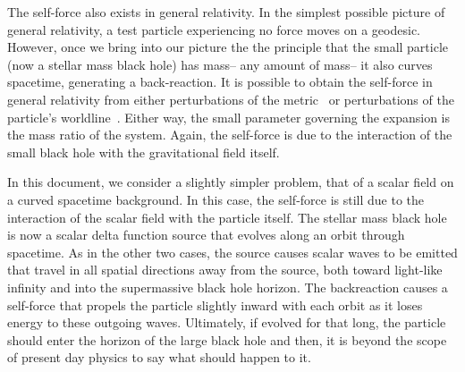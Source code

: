 The self-force also exists in general relativity. In the simplest possible picture of general relativity, a test particle experiencing no force moves on a geodesic. However, once we bring into our picture the the principle that the small particle (now a stellar mass black hole) has mass-- any amount of mass-- it also curves spacetime, generating a back-reaction. It is possible to obtain the self-force in general relativity from either perturbations of the metric~\cite{pound2ndOrderSelfForce2} or perturbations of the particle's worldline~\cite{WardellSelfForceReview}. Either way, the small parameter governing the expansion is the mass ratio of the system. Again, the self-force is due to the interaction of the small black hole with the gravitational field itself.

In this document, we consider a slightly simpler problem, that of a scalar field on a curved spacetime background. In this case, the self-force is still due to the interaction of the scalar field with the particle itself. The stellar mass black hole is now a scalar delta function source that evolves along an orbit through spacetime. As in the other two cases, the source causes scalar waves to be emitted that travel in all spatial directions away from the source, both toward light-like infinity and into the supermassive black hole horizon. The backreaction causes a self-force that propels the particle slightly inward with each orbit as it loses energy to these outgoing waves. Ultimately, if evolved for that long, the particle should enter the horizon of the large black hole and then, it is beyond the scope of present day physics to say what should happen to it. 



